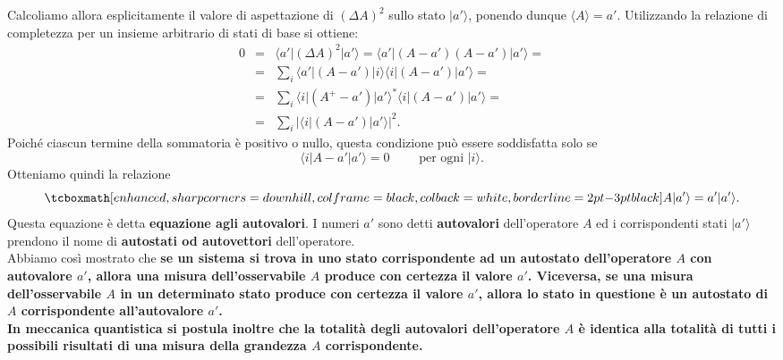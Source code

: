 Calcoliamo allora esplicitamente il valore di aspettazione di $(\Delta A )^2$ sullo stato $\vert a' \rangle$, ponendo dunque $\langle A \rangle = a'$. Utilizzando la relazione di completezza per un insieme arbitrario di stati di base si ottiene:
	\begin{eqnarray}
		0 & = & \langle a' \vert (\Delta A )^2 \vert a'\rangle = \langle a' \vert (A-a' )(A-a') \vert a'\rangle= \nonumber \\
		& = & \sum _i \langle a' \vert (A-a' ) \vert i \rangle \langle i \vert (A-a' ) \vert a' \rangle = \nonumber \\
		& = & \sum _i \langle i \vert (A^{+}-a' ) \vert a' \rangle ^* \langle i \vert (A-a' ) \vert a' \rangle = \nonumber \\
		& = & \sum _i \vert \langle i \vert (A-a' ) \vert a' \rangle \vert ^2.
	\end{eqnarray}
Poiché ciascun termine della sommatoria è positivo o nullo, questa condizione può essere soddisfatta solo se
	\begin{equation}
		\langle i \vert A-a' \vert a' \rangle =0 \qquad \textrm{ per ogni } \vert i \rangle .
	\end{equation}
Otteniamo quindi la relazione
	\begin{equation}
		\tcboxmath[enhanced, sharp corners=downhill, colframe=black, colback=white, borderline={2pt}{-3pt}{black}]{
			A \vert a' \rangle =a' \vert a' \rangle .
			}
	\end{equation}
Questa equazione è detta \textbf{equazione agli autovalori}. I numeri $a'$ sono detti \textbf{autovalori} dell'operatore $A$ ed i corrispondenti stati $\vert a' \rangle $ prendono il nome di \textbf{autostati od autovettori} dell'operatore.\\

Abbiamo così mostrato che \textbf{se un sistema si trova in uno stato corrispondente ad un autostato dell'operatore $A$ con autovalore $a'$, allora una misura dell'osservabile $A$ produce con certezza il valore $a'$. Viceversa, se una misura dell'osservabile $A$ in un determinato stato produce con certezza il valore $a'$, allora lo stato in questione è un autostato di $A$ corrispondente all'autovalore $a'$.}\\

\textbf{In meccanica quantistica si postula inoltre che la totalità degli autovalori dell'operatore $A$ è identica alla totalità di tutti i possibili risultati di una misura della grandezza $A$ corrispondente.}\\

